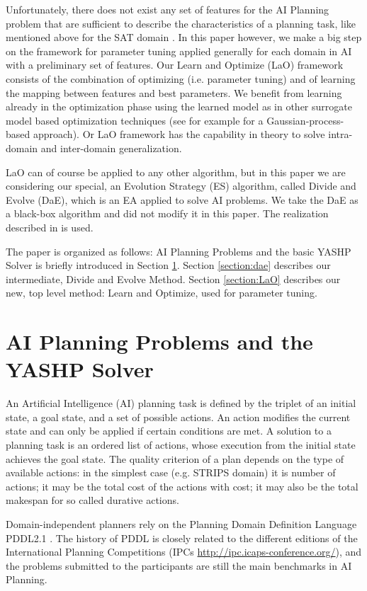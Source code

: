 \documentclass{article}
\begin{document}
Unfortunately, there does not exist any set of features for the AI Planning problem that are sufficient to describe the characteristics of a planning task, like mentioned above for the SAT domain \cite{Hutter06}. In this paper however, we make a big step on the framework for parameter tuning applied generally for each domain in AI with a preliminary set of features. Our Learn and Optimize (LaO) framework consists of the combination of optimizing (i.e. parameter tuning) and of learning the mapping between features and best parameters. We benefit from learning already in the optimization phase using the learned model as in other surrogate model based optimization techniques (see for example \cite{Bardenet} for a Gaussian-process-based approach). Or LaO framework has the capability in theory to solve intra-domain and inter-domain generalization.

LaO can of course be applied to any other algorithm, but in this paper we are considering our special, an Evolution Strategy (ES) algorithm, called Divide and Evolve (DaE), which is an EA applied to solve AI problems. We take the DaE as a black-box algorithm and did not modify it in this paper. The realization described in \cite{BibEvoCop:2010} is used. 

The paper is organized as follows: AI Planning Problems and the basic YASHP Solver is briefly introduced in Section \ref{section:planning}. Section \ref{section:dae} describes our intermediate, Divide and Evolve Method. Section \ref{section:LaO} describes our new, top level method: Learn and Optimize, used for parameter tuning. 

\section{AI Planning Problems and the YASHP Solver}
\label{section:planning}

An Artificial Intelligence (AI) planning task is defined by the triplet of an initial state, a goal state, and a set of possible actions. An action modifies the current state and can only be applied if certain conditions are met. A solution to a planning task is an ordered list of actions, whose execution from the initial state achieves the goal state. The quality criterion of a plan depends on the type of available actions: in the simplest case (e.g. STRIPS domain) it is number of actions; it may be the total cost of the actions with cost; it may also be the total makespan for so called durative actions.

Domain-independent planners rely on the Planning Domain Definition Language PDDL2.1 \cite{Fox-JAIR-2003}. The history of PDDL is closely related to the different editions of the International Planning Competitions (IPCs \url{http://ipc.icaps-conference.org/}), and the problems submitted to the participants are still the main benchmarks in AI Planning.
\end{document}
